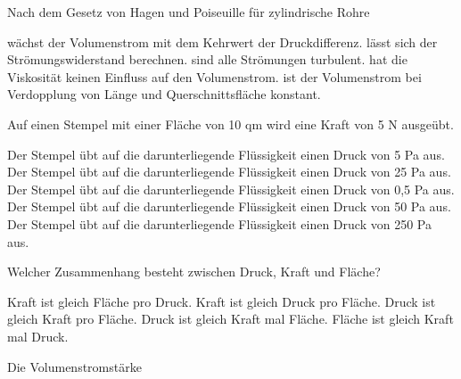 \documentclass[11pt]{exam}
\begin{document}
\setlength{\voffset}{-0.5in}
\setlength{\headsep}{5pt}

\hspace{2mm}
 \hspace{5mm}
\vspace{4mm}

\begin{questions}

\question Nach dem Gesetz von Hagen und Poiseuille für zylindrische Rohre

\begin{choices}
	\choice wächst der Volumenstrom mit dem Kehrwert der Druckdifferenz.
	\choice lässt sich der Strömungswiderstand berechnen.
	\choice sind alle Strömungen turbulent.
	\choice hat die Viskosität keinen Einfluss auf den Volumenstrom.
	\choice ist der Volumenstrom bei Verdopplung von Länge und Querschnittsfläche konstant.
\end{choices}

\vspace{3mm}\question Auf einen Stempel mit einer Fläche von 10 qm wird eine Kraft von 5 N ausgeübt.

\begin{choices}
	\choice Der Stempel übt auf die darunterliegende Flüssigkeit einen Druck von 5 Pa aus.
	\choice Der Stempel übt auf die darunterliegende Flüssigkeit einen Druck von 25 Pa aus.
	\choice Der Stempel übt auf die darunterliegende Flüssigkeit einen Druck von 0,5 Pa aus.
	\choice Der Stempel übt auf die darunterliegende Flüssigkeit einen Druck von 50 Pa aus.
	\choice Der Stempel übt auf die darunterliegende Flüssigkeit einen Druck von 250 Pa aus.
\end{choices}

\vspace{3mm}\question Welcher Zusammenhang besteht zwischen Druck, Kraft und Fläche?

\begin{choices}
	\choice Kraft ist gleich Fläche pro Druck.
	\choice Kraft ist gleich Druck pro Fläche.
	\choice Druck ist gleich Kraft pro Fläche.
	\choice Druck ist gleich Kraft mal Fläche.
	\choice Fläche ist gleich Kraft mal Druck.
\end{choices}

\vspace{3mm}\question Die Volumenstromstärke


\end{questions}
\end{document}
